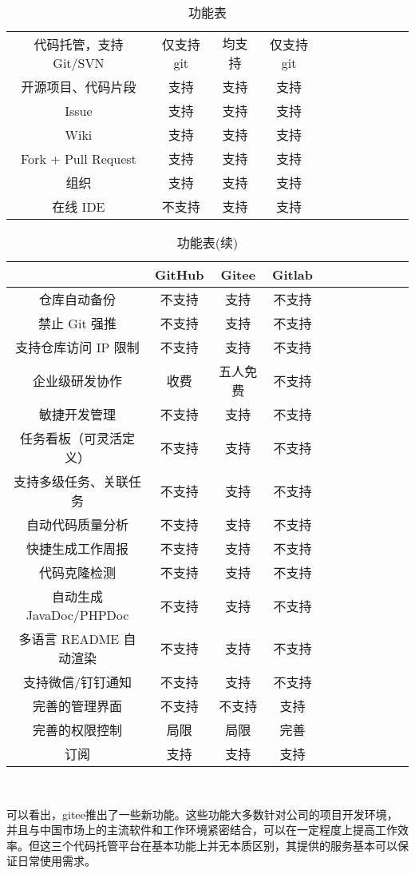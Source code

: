\documentclass{homework}
\begin{document}
\begin{itemize}
\begin{table}[!htbp]
\begin{tabular}{ccccccccccc}
				\midrule
				代码托管，支持 Git/SVN& 仅支持git & 均支持& 仅支持git	\\	
				开源项目、代码片段& 支持 &支持&支持		\\
				Issue& 	支持 &支持&支持		\\
				Wiki& 	支持 &支持&支持		\\
				Fork + Pull Request	& 支持 &支持&支持		\\
				组织& 	支持 &支持&支持		\\
				在线 IDE& 不支持& 支持& 支持\\
				\bottomrule
			\end{tabular}
			\caption{功能表}
		\end{table}
		\begin{table}[!htbp]
			\centering
			\begin{tabular}{ccccccccccc}
			\toprule  
			 & \textbf{GitHub}& \textbf{Gitee}& \textbf{Gitlab}\\
				\midrule
				仓库自动备份& 	不支持& 支持& 不支持&\\
				禁止 Git 强推& 	不支持&  支持& 不支持&\\
				支持仓库访问 IP 限制& 不支持& 支持& 不支持&\\
				企业级研发协作& 收费 &五人免费& 不支持&\\
				敏捷开发管理& 不支持&	支持&	不支持&\\
				任务看板（可灵活定义）& 不支持& 支持& 不支持&\\		
				支持多级任务、关联任务& 不支持& 支持& 不支持&\\		
				自动代码质量分析& 不支持& 支持&	不支持&\\	
				快捷生成工作周报& 不支持& 支持&	不支持&\\	
				代码克隆检测& 不支持& 支持&	不支持&\\
				自动生成 JavaDoc/PHPDoc	& 不支持& 支持&	不支持&\\
				多语言 README 自动渲染& 不支持&	 支持& 不支持&\\	
				支持微信/钉钉通知& 	不支持&	支持& 不支持&\\
				完善的管理界面& 不支持& 不支持& 支持\\
				完善的权限控制& 局限& 局限& 完善\\
				订阅& 支持& 支持& 支持\\
				\bottomrule
			\end{tabular}
			\caption{功能表(续)}
		\end{table}
		\\
		\par 可以看出，gitee推出了一些新功能。这些功能大多数针对公司的项目开发环境，并且与中国市场上的主流软件和工作环境紧密结合，可以在一定程度上提高工作效率。但这三个代码托管平台在基本功能上并无本质区别，其提供的服务基本可以保证日常使用需求。

\end{itemize}
\end{document}
